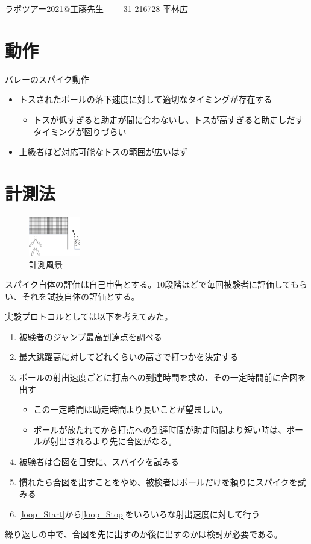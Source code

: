 \documentclass[a4paper,11pt]{jsarticle}
\begin{document}

ラボツアー2021@工藤先生
------31-216728 平林広

\section{動作}
バレーのスパイク動作
\begin{itemize}
  \item トスされたボールの落下速度に対して適切なタイミングが存在する
  \begin{itemize}
    \item トスが低すぎると助走が間に合わないし、トスが高すぎると助走しだすタイミングが図りづらい
  \end{itemize}
  \item 上級者ほど対応可能なトスの範囲が広いはず
\end{itemize}

\section{計測法}
\begin{figure}
  \centering
  \includegraphics[width = 0.2\textwidth]{spike.png}
  \caption{計測風景}
  \label{}
\end{figure}
スパイク自体の評価は自己申告とする。10段階ほどで毎回被験者に評価してもらい、それを試技自体の評価とする。

実験プロトコルとしては以下を考えてみた。
\begin{enumerate}
  \item 被験者のジャンプ最高到達点を調べる
  \item 最大跳躍高に対してどれくらいの高さで打つかを決定する
  \item ボールの射出速度ごとに打点への到達時間を求め、その一定時間前に合図を出す\label{loop_Start}
  \begin{itemize}
    \item この一定時間は助走時間より長いことが望ましい。
    \item ボールが放たれてから打点への到達時間が助走時間より短い時は、ボールが射出されるより先に合図がなる。
  \end{itemize}
  \item 被験者は合図を目安に、スパイクを試みる
  \item 慣れたら合図を出すことをやめ、被検者はボールだけを頼りにスパイクを試みる\label{loop_Stop}
  \item \ref{loop_Start}から\ref{loop_Stop}をいろいろな射出速度に対して行う
\end{enumerate}
繰り返しの中で、合図を先に出すのか後に出すのかは検討が必要である。
\end{document}
